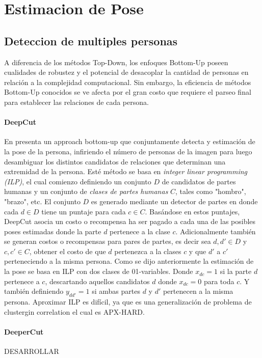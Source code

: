 \documentclass[runningheads]{llncs}
\begin{document}
\section{Estimacion de Pose}

\subsection{Deteccion de multiples personas}
A diferencia de los métodos Top-Down, los enfoques Bottom-Up poseen cualidades de robustez y el potencial de desacoplar la cantidad de personas en relación a la complejidad computacional. Sin embargo, la eficiencia de métodos Bottom-Up conocidos se ve afecta por el gran costo que requiere el parseo final para establecer las relaciones de cada persona.

\paragraph{DeepCut} En \cite{bottom1} presenta un approach bottom-up que conjuntamente detecta y estimación de la pose de la persona, infiriendo el número de personas de la imagen para luego desambiguar los distintos candidatos de relaciones que determinan una extremidad de la persona. Esté método se basa en \textit{integer linear programming (ILP)}, el cual comienzo definiendo un conjunto $D$ de candidatos de partes humanas y un conjunto de \textit{clases de partes humanas} $C$, tales como "hombro", "brazo", etc. El conjunto $D$ es generado mediante un detector de partes en donde cada $ d \in D$ tiene un puntaje para cada $ c \in C$. Basándose en estos puntajes, DeepCut asocia un costo o recompensa ha ser pagado a cada una de las posibles poses estimadas donde la parte $d$ pertenece a la clase $c$. Adicionalmente también se generan costos o recompensas para pares de partes, es decir sea $d,d' \in D$ y $c,c' \in C$, obtener el costo de que $d$ pertenezca a la clases $c$ y que $d'$ a $c'$ perteneciendo a la misma persona.
Como se dijo anteriormente la estimación de la pose se basa en ILP con dos clases de 01-variables. Donde $x_{dc} = 1$ si la parte $d$ pertenece a $c$, descartando aquellos candidatos $d$ donde $x_{dc} = 0$ para toda $c$. Y también definiendo $y_{dd'} = 1 $ si ambas partes $d$ y $d'$ pertenecen a la misma persona. Aproximar ILP es difícil, ya que es una generalización de problema de clustergin correlation el cual es APX-HARD.

\paragraph{DeeperCut} DESARROLLAR \cite{bottom2}
\end{document}
